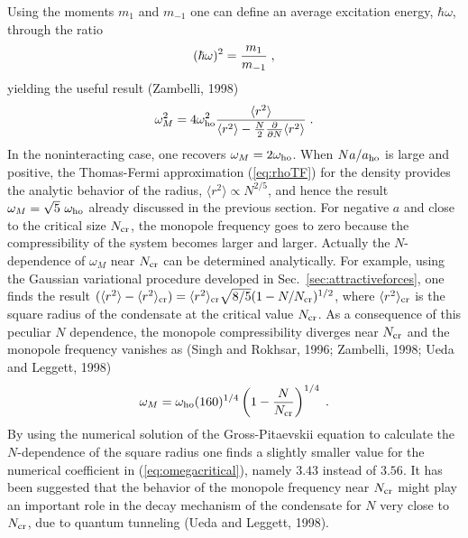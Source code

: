 Using the  moments $m_1$ and $m_{-1}$ one can define an average 
excitation energy, $\hbar\omega$, through the ratio
\begin{equation}
(\hbar\omega)^2 = {m_1\over m_{-1}} \; ,
\label{eq:omega1-1}
\end{equation}
yielding the useful result (Zambelli, 1998)
\begin{equation}
\omega^2_M = 4 \omega^2_{\rm ho}{\langle r^2 \rangle \over
\langle r^2 \rangle- {N\over 2}
{\partial \over  \partial N }  \langle r^2 \rangle } \; .
\label{eq:omegasumrule}
\end{equation}
In the noninteracting case,  
one  recovers  $\omega_M= 2\omega_{\rm ho}$. When $Na/a_{\rm ho}$ 
is large and  positive, the Thomas-Fermi approximation (\ref{eq:rhoTF}) 
for the density provides the analytic behavior of the radius, $\langle r^2
\rangle \propto N^{2/5}$, and hence the result $\omega_M
=\sqrt{5}\ \omega_{\rm ho}$ already discussed in the previous section.  
For negative $a$ and close to the critical size $N_{\rm cr}$,  the monopole
frequency goes to zero  because the compressibility of the system becomes
larger and larger.   Actually the $N$-dependence of $\omega_M$ near
$N_{\rm cr}$ can be determined analytically. For example, using the Gaussian
variational procedure developed in  Sec.~\ref{sec:attractiveforces},
one finds the result  $(\langle r^2 \rangle - \langle r^2
\rangle_{\rm cr})= \langle r^2 \rangle_{\rm cr}
\sqrt{8/5}(1-N/N_{\rm cr})^{1/2}$,
where  $\langle r^2 \rangle_{\rm cr}$ is the square radius of the
condensate at  the critical value $N_{\rm cr}$. As a
consequence of this peculiar $N$ dependence, the monopole
compressibility diverges  near $N_{\rm cr}$ and the monopole frequency
vanishes as (Singh and Rokhsar, 1996; Zambelli, 1998; Ueda and Leggett, 
1998)
\begin{equation}
\omega_M = \omega_{\rm ho}(160)^{1/4}
 \left(1-{N\over N_{\rm cr}}\right)^{1/4} \; .
\label{eq:omegacritical}
\end{equation}
By using the numerical solution of the Gross-Pitaevskii equation to
calculate the $N$-dependence of  the square radius one finds  a  slightly
smaller value for the numerical coefficient in (\ref{eq:omegacritical}),
namely $3.43$ instead of $3.56$. It has been suggested that the behavior
of the monopole frequency near $N_{\rm cr}$ might play an important 
role in the decay mechanism of the condensate for $N$ very close to 
$N_{\rm cr}$, due to quantum tunneling (Ueda and Leggett, 1998).

